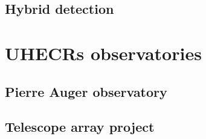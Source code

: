 \subsection{Hybrid detection}

\section{UHECRs observatories}
\subsection{Pierre Auger observatory}

\subsection{Telescope array project}
